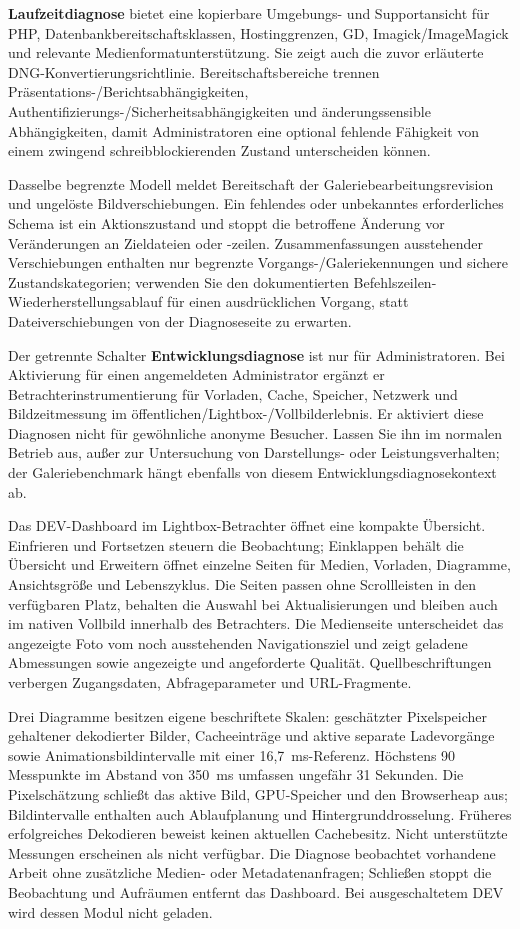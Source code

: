 \documentclass[11pt,a4paper]{article}
\newcommand{\ui}[1]{\textbf{#1}}
\begin{document}
\ui{Laufzeitdiagnose} bietet eine kopierbare Umgebungs- und Supportansicht für
PHP, Datenbankbereitschaftsklassen, Hostinggrenzen, GD, Imagick/ImageMagick und
relevante Medienformatunterstützung. Sie zeigt auch die zuvor erläuterte
DNG-Konvertierungsrichtlinie. Bereitschaftsbereiche trennen
Präsentations-/Berichtsabhängigkeiten,
Authentifizierungs-/Sicherheitsabhängigkeiten und änderungssensible
Abhängigkeiten, damit Administratoren eine optional fehlende Fähigkeit von einem
zwingend schreibblockierenden Zustand unterscheiden können.

Dasselbe begrenzte Modell meldet Bereitschaft der Galeriebearbeitungsrevision
und ungelöste Bildverschiebungen. Ein fehlendes oder unbekanntes erforderliches
Schema ist ein Aktionszustand und stoppt die betroffene Änderung vor
Veränderungen an Zieldateien oder -zeilen. Zusammenfassungen ausstehender
Verschiebungen enthalten nur begrenzte Vorgangs-/Galeriekennungen und sichere
Zustandskategorien; verwenden Sie den dokumentierten
Befehlszeilen-Wiederherstellungsablauf für einen ausdrücklichen Vorgang, statt
Dateiverschiebungen von der Diagnoseseite zu erwarten.

Der getrennte Schalter \ui{Entwicklungsdiagnose} ist nur für Administratoren.
Bei Aktivierung für einen angemeldeten Administrator ergänzt er
Betrachterinstrumentierung für Vorladen, Cache, Speicher, Netzwerk und
Bildzeitmessung im öffentlichen/Lightbox-/Vollbilderlebnis. Er aktiviert diese
Diagnosen nicht für gewöhnliche anonyme Besucher. Lassen Sie ihn im normalen
Betrieb aus, außer zur Untersuchung von Darstellungs- oder Leistungsverhalten;
der Galeriebenchmark hängt ebenfalls von diesem Entwicklungsdiagnosekontext ab.

Das DEV-Dashboard im Lightbox-Betrachter öffnet eine kompakte Übersicht.
Einfrieren und Fortsetzen steuern die Beobachtung; Einklappen behält die
Übersicht und Erweitern öffnet einzelne Seiten für Medien, Vorladen, Diagramme,
Ansichtsgröße und Lebenszyklus. Die Seiten passen ohne Scrollleisten in den
verfügbaren Platz, behalten die Auswahl bei Aktualisierungen und bleiben auch im
nativen Vollbild innerhalb des Betrachters. Die Medienseite unterscheidet das
angezeigte Foto vom noch ausstehenden Navigationsziel und zeigt geladene
Abmessungen sowie angezeigte und angeforderte Qualität. Quellbeschriftungen
verbergen Zugangsdaten, Abfrageparameter und URL-Fragmente.

Drei Diagramme besitzen eigene beschriftete Skalen: geschätzter Pixelspeicher
gehaltener dekodierter Bilder, Cacheeinträge und aktive separate Ladevorgänge
sowie Animationsbildintervalle mit einer 16,7~ms-Referenz. Höchstens 90
Messpunkte im Abstand von 350~ms umfassen ungefähr 31 Sekunden. Die
Pixelschätzung schließt das aktive Bild, GPU-Speicher und den Browserheap aus;
Bildintervalle enthalten auch Ablaufplanung und Hintergrunddrosselung. Früheres
erfolgreiches Dekodieren beweist keinen aktuellen Cachebesitz. Nicht
unterstützte Messungen erscheinen als nicht verfügbar. Die Diagnose beobachtet
vorhandene Arbeit ohne zusätzliche Medien- oder Metadatenanfragen; Schließen
stoppt die Beobachtung und Aufräumen entfernt das Dashboard. Bei ausgeschaltetem
DEV wird dessen Modul nicht geladen.
\end{document}
